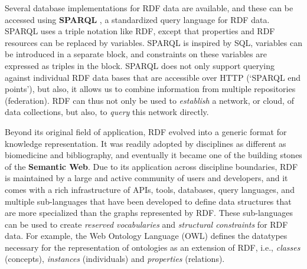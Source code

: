 Several database implementations for RDF data are available, and these can be accessed using \textbf{SPARQL} \citep{prud2008sparql}, a standardized query language for RDF data.
SPARQL uses a triple notation like RDF, except that properties and RDF resources can be replaced by variables. SPARQL is inspired by SQL, variables can be introduced in a separate  block, and constraints on these variables are expressed as triples in the  block. SPARQL does not only support querying against individual RDF data bases that are accessible over HTTP (`SPARQL end points'), but also, it allows us to combine information from multiple repositories (federation). RDF can thus not only be used to \emph{establish} a network, or cloud, of data collections, but also, to \emph{query} this network directly.

Beyond its original field of application, RDF evolved into a generic format for knowledge representation. It was readily adopted by disciplines as different as biomedicine and bibliography, and eventually it became one of the building stones of the \textbf{Semantic Web}. Due to its application across discipline boundaries, RDF is maintained by a large and active community of users and developers, and it comes with a rich infrastructure of APIs, tools, databases, query languages, and multiple sub-languages that have been developed to define data structures that are more specialized than the graphs represented by RDF. These sub-languages can be used to create \emph{reserved vocabularies} and \emph{structural constraints} for RDF data. For example, the Web Ontology Language (OWL) defines the datatypes necessary for the representation of ontologies as an extension of RDF, i.e., \emph{classes} (concepts), \emph{instances} (individuals) and \emph{properties} (relations). 

